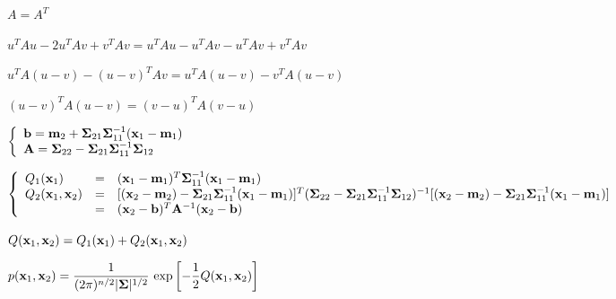 \documentclass{article}
\def\lthtmlcheckvsize{\ifdim\ht\sizebox<\vsize 
  \ifdim\wd\sizebox<\hsize\expandafter\hfill\fi \expandafter\vfill
  \else\expandafter\vss\fi}%
\begin{document}
{\newpage\clearpage
{}%
$ A=A^T$%
\lthtmlindisplaymathZ
\lthtmlcheckvsize\clearpage}

{\newpage\clearpage
{}%
$\displaystyle u^TAu-2u^TAv+v^TAv=u^T Au-u^TAv-u^TAv+v^TAv$%
\lthtmlindisplaymathZ
\lthtmlcheckvsize\clearpage}

{\newpage\clearpage
{}%
$\displaystyle u^TA(u-v)-(u-v)^TAv=u^TA(u-v)-v^TA(u-v)$%
\lthtmlindisplaymathZ
\lthtmlcheckvsize\clearpage}

{\newpage\clearpage
{}%
$\displaystyle (u-v)^TA(u-v)=(v-u)^TA(v-u)$%
\lthtmlindisplaymathZ
\lthtmlcheckvsize\clearpage}

{\newpage\clearpage
{}%
$\displaystyle \left\{   \begin{array}{l}
{\bf b}={\bf m}_2+{\bf\Sigma}_{21}{\bf\Sigma}_{11}^{-1}({\bf x}_1-{\bf m}_1) \\
{\bf A}={\bf\Sigma}_{22}-{\bf\Sigma}_{21}{\bf\Sigma}_{11}^{-1}{\bf\Sigma}_{12}
\end{array}  \right.$%
\lthtmlindisplaymathZ
\lthtmlcheckvsize\clearpage}

{\newpage\clearpage
{}%
$\displaystyle \left\{ \begin{array}{lcl}
Q_1({\bf x}_1)&=&({\bf x}_1-{\bf m}_1)^T {\bf\Sigma}_{11}^{-1} ({\bf x}_1-{\bf m}_1) \\
Q_2({\bf x}_1,{\bf x}_2)&=&
[({\bf x}_2-{\bf m}_2)-{\bf\Sigma}_{21}{\bf\Sigma}_{11}^{-1}({\bf x}_1-{\bf m}_1)]^T
({\bf\Sigma}_{22}-{\bf\Sigma}_{21}{\bf\Sigma}_{11}^{-1}{\bf\Sigma}_{12})^{-1}
[({\bf x}_2-{\bf m}_2)-{\bf\Sigma}_{21}{\bf\Sigma}_{11}^{-1}({\bf x}_1-{\bf m}_1)] \\
&=&({\bf x}_2-{\bf b})^T {\bf A}^{-1}({\bf x}_2-{\bf b})
\end{array} \right.$%
\lthtmlindisplaymathZ
\lthtmlcheckvsize\clearpage}

{\newpage\clearpage
{}%
$\displaystyle Q({\bf x}_1,{\bf x}_2)=Q_1({\bf x}_1)+Q_2({\bf x}_1,{\bf x}_2)$%
\lthtmlindisplaymathZ
\lthtmlcheckvsize\clearpage}

{\newpage\clearpage
{}%
$\displaystyle p({\bf x}_1,{\bf x}_2)
=\frac{1}{(2\pi)^{n/2}|{\bf\Sigma}|^{1/2}}\,\exp\left[-\frac{1}{2}Q({\bf x}_1,{\bf x}_2)\right]$%
\lthtmlindisplaymathZ
\lthtmlcheckvsize\clearpage}
\end{document}
